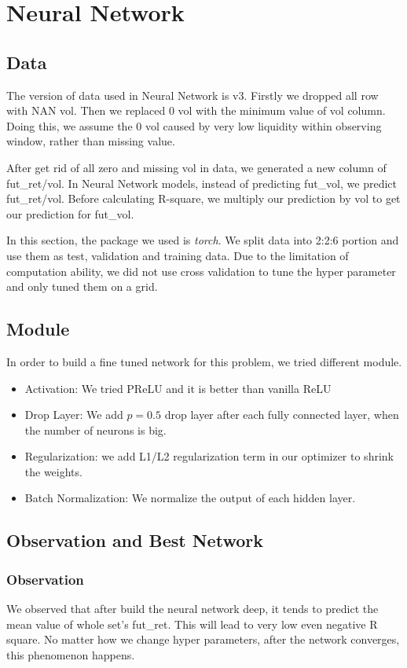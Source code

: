 \documentclass[onecolumn]{article}
\begin{document}


\section{Neural Network}
\subsection{Data}
The version of data used in Neural Network is v3. Firstly we dropped all row with NAN vol. Then we replaced 0 vol with the minimum value of vol column. Doing this, we assume the 0 vol caused by very low liquidity within observing window, rather than missing value.

After get rid of all zero and missing vol in data, we generated a new column of fut\_ret/vol. In Neural Network models, instead of predicting fut\_vol, we predict fut\_ret/vol. Before calculating R-square, we multiply our prediction by vol to get our prediction for fut\_vol.

In this section, the package we used is \textit{torch}. We split data into 2:2:6 portion and use them as test, validation and training data. Due to the limitation of computation ability, we did not use cross validation to tune the hyper parameter and only tuned them on a grid. 

\subsection{Module}
In order to build a fine tuned network for this problem, we tried different module.
\begin{itemize}
    \item Activation: We tried PReLU and it is better than vanilla ReLU
    \item Drop Layer: We add $p=0.5$ drop layer after each fully connected layer, when the number of neurons is big. 
    \item Regularization: we add L1/L2 regularization term in our optimizer to shrink the weights.
    \item Batch Normalization: We normalize the output of each hidden layer.
\end{itemize}


\subsection{Observation and Best Network}
\subsubsection{Observation}
We observed that after build the neural network deep, it tends to predict the mean value of whole set's fut\_ret. This will lead to very low even negative R square. No matter how we change hyper parameters, after the network converges, this phenomenon happens.
\end{document}
